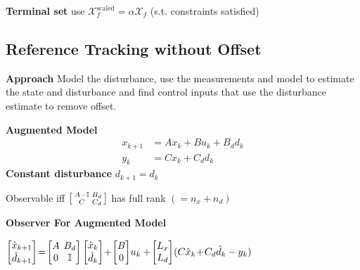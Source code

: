 \textbf{Terminal set} use
$\mathcal{X}_f^{\text{scaled}} = \alpha \mathcal{X}_f$
(s.t. constraints satisfied)

\subsection{Reference Tracking without Offset}

\textbf{Approach}
Model the disturbance,
use the measurements and model
to estimate the state and disturbance
and find control inputs that use
the disturbance estimate to remove offset.

\textbf{Augmented Model}
\begin{align*}
	x_{k+1} & = Ax_k + Bu_k + B_d d_k \\
	y_k     & = Cx_k + C_d d_k
\end{align*}
\textbf{Constant disturbance}
$d_{k+1}  = d_k$

Observable iff
$\begin{bsmallmatrix}
		A - \mathbb{I} & B_d \\ C & C_d
	\end{bsmallmatrix}$
has full rank $(=n_x + n_d)$

\textbf{Observer For Augmented Model}

$
	\begin{bmatrix}
		\hat{x}_{k+1} \\
		\hat{d}_{k+1}
	\end{bmatrix}
	\!=\!
	\begin{bmatrix}
		A & \hspace{-2mm} B_d       \\
		0 & \hspace{-2mm}\mathbb{I}
	\end{bmatrix}
	\begin{bmatrix}
		\hat{x}_{k} \\
		\hat{d}_{k}
	\end{bmatrix}
	\!+\!
	\begin{bmatrix}
		B \\
		0
	\end{bmatrix}
	\!u_{k}
	+
	\hspace{-.5mm}
	\begin{bmatrix}
		L_x \\
		L_d
	\end{bmatrix}
	\hspace{-.5mm}
	(C\hat{x}_{k} \!+\! C_d \hat{d}_{k}-y_{k})
$


